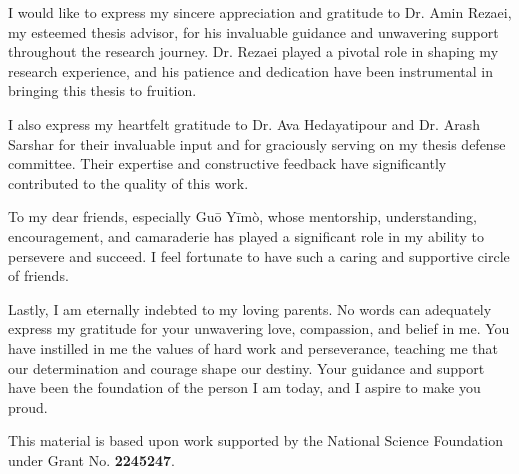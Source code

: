 \begingroup
\RaggedRight

I would like to express my sincere appreciation and gratitude to Dr. Amin Rezaei, my esteemed thesis advisor, for his invaluable guidance and unwavering support throughout the research journey. Dr. Rezaei played a pivotal role in shaping my research experience, and his patience and dedication have been instrumental in bringing this thesis to fruition.

I also express my heartfelt gratitude to Dr. Ava Hedayatipour and Dr. Arash Sarshar for their invaluable input and for graciously serving on my thesis defense committee. Their expertise and constructive feedback have significantly contributed to the quality of this work.

To my dear friends, especially Guō Yīmò, whose mentorship, understanding, encouragement, and camaraderie has played a significant role in my ability to persevere and succeed. I feel fortunate to have such a caring and supportive circle of friends.

Lastly, I am eternally indebted to my loving parents. No words can adequately express my gratitude for your unwavering love, compassion, and belief in me. You have instilled in me the values of hard work and perseverance, teaching me that our determination and courage shape our destiny. Your guidance and support have been the foundation of the person I am today, and I aspire to make you proud.

This material is based upon work supported by the National Science Foundation under Grant No. \textbf{2245247}.




\endgroup